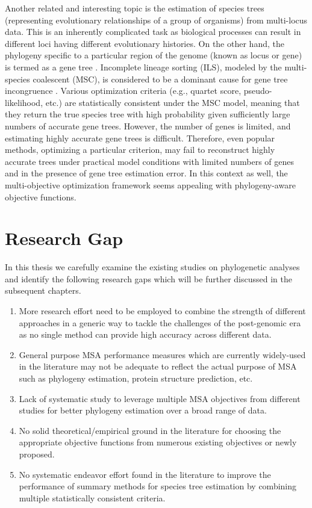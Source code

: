 Another related and interesting topic is the estimation of species trees (representing evolutionary relationships of a group of organisms) from multi-locus data. This is an inherently complicated task as biological processes can result in different loci having different evolutionary histories. On the other hand, the phylogeny specific to a particular region of the genome (known as locus or gene) is termed as a gene tree \cite{maddison1997gene}. Incomplete lineage sorting (ILS), modeled by the multi-species coalescent (MSC), is considered to be a dominant cause for gene tree incongruence \cite{mirarab2014evaluating, statistical-binning}. Various optimization criteria (e.g., quartet score, pseudo-likelihood, etc.) are statistically consistent under the MSC model, meaning that they return the true species tree with high probability given sufficiently large numbers of accurate gene trees. However, the number of genes is limited, and estimating highly accurate gene trees is difficult. Therefore, even popular methods, optimizing a particular criterion, may fail to reconstruct highly accurate trees under practical model conditions with limited numbers of genes and in the presence of gene tree estimation error. In this context as well, the multi-objective optimization framework seems appealing with phylogeny-aware objective functions.

\section{Research Gap}
In this thesis we carefully examine the existing studies on phylogenetic analyses and identify the following research gaps which will be further discussed in the subsequent chapters.
\begin{enumerate}
	\item  More research effort need to be employed to combine the strength of different approaches in a generic way to tackle the challenges of the post-genomic era as no single method can provide high accuracy across different data. 
	
	
	\item  General purpose MSA performance measures which are currently widely-used in the literature may not be adequate to reflect the actual purpose of MSA such as phylogeny estimation, protein structure prediction, etc.
	
	
	\item  Lack of systematic study to leverage multiple MSA objectives from different studies for better phylogeny estimation over a broad range of data.
	
	
	\item  No solid theoretical/empirical ground in the literature for choosing the appropriate objective functions from numerous existing objectives  or newly proposed.
	
	
	\item No systematic endeavor effort found in the literature to improve the performance of summary methods for species tree estimation by combining multiple statistically consistent criteria.
\end{enumerate}

